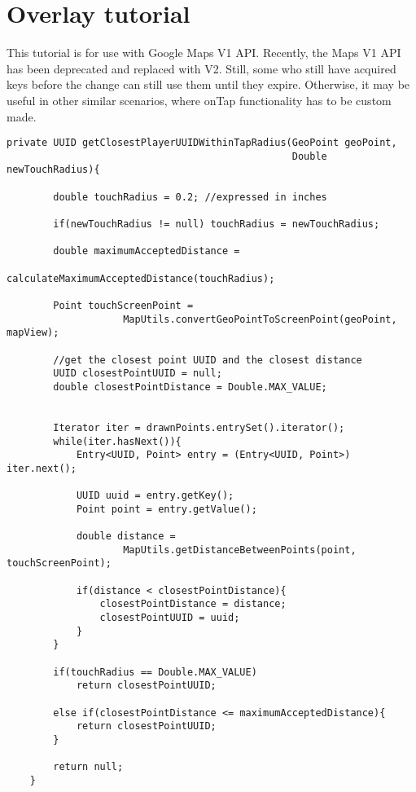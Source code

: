 
\section{Overlay tutorial}

This tutorial is for use with Google Maps V1 API. Recently, the Maps V1 API has
been deprecated and replaced with V2. Still, some who still have acquired keys
before the change can still use them until they expire. Otherwise, it
may be useful in other similar scenarios, where onTap functionality
has to be custom made.\newline
\begin{verbatim}
private UUID getClosestPlayerUUIDWithinTapRadius(GeoPoint geoPoint,
												 Double newTouchRadius){
		
		double touchRadius = 0.2; //expressed in inches
		
		if(newTouchRadius != null) touchRadius = newTouchRadius;		 
				
		double maximumAcceptedDistance = 
								calculateMaximumAcceptedDistance(touchRadius);
		
		Point touchScreenPoint = 
					MapUtils.convertGeoPointToScreenPoint(geoPoint, mapView);
		
		//get the closest point UUID and the closest distance
		UUID closestPointUUID = null;
		double closestPointDistance = Double.MAX_VALUE;
			
		
		Iterator iter = drawnPoints.entrySet().iterator();
		while(iter.hasNext()){			
			Entry<UUID, Point> entry = (Entry<UUID, Point>) iter.next();
			
			UUID uuid = entry.getKey();
			Point point = entry.getValue();
			
			double distance = 
					MapUtils.getDistanceBetweenPoints(point, touchScreenPoint);
			
			if(distance < closestPointDistance){
				closestPointDistance = distance;
				closestPointUUID = uuid;		
			}
		}
		
		if(touchRadius == Double.MAX_VALUE) 
			return closestPointUUID;
		
		else if(closestPointDistance <= maximumAcceptedDistance){
			return closestPointUUID;
		}		
		
		return null;		
	}
	
\end{verbatim}

